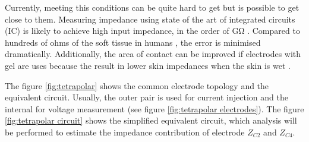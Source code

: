 Currently, meeting this conditions can be quite hard to get but is possible to get close to them. Measuring impedance using state of the art of integrated circuits (IC) is likely to achieve high input impedance, in the order of \si{\giga\ohm} \cite{ad:AD8421}. Compared to hundreds of ohms of the soft tissue in humans \cite{faes1999electric, grimnes1983impedance}, the error is minimised dramatically. Additionally, the area of contact can be improved if electrodes with gel are uses because the result in lower skin impedances when the skin is wet \cite{mcadams1996factors, grimnes1983impedance}.

The figure \ref{fig:tetrapolar} shows the common electrode topology and the equivalent circuit. Usually, the outer pair is used for current injection and the internal for voltage measurement (see figure \ref{fig:tetrapolar electrodes}). The figure \ref{fig:tetrapolar circuit} shows the simplified equivalent circuit, which analysis will be performed to estimate the impedance contribution of electrode $Z_{C2}$ and $Z_{C4}$. 

